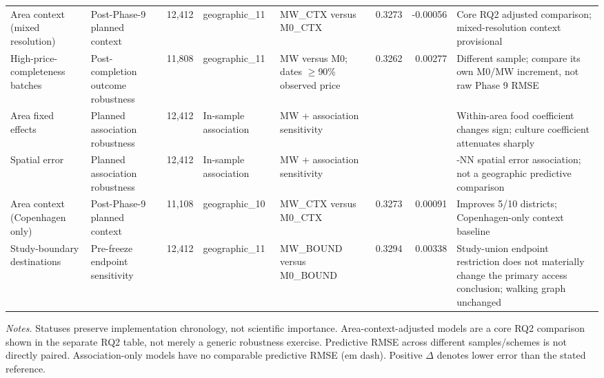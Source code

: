 \begin{landscape}
\begin{longtable}{>{\raggedright\arraybackslash}p{3.0cm}>{\raggedright\arraybackslash}p{2.9cm}r>{\raggedright\arraybackslash}p{2.7cm}>{\raggedright\arraybackslash}p{3.1cm}rr>{\raggedright\arraybackslash}p{6.7cm}}
Area context (mixed resolution) & Post-Phase-9 planned context & 12,412 & geographic\_\allowbreak{}11 & MW\_\allowbreak{}CTX versus M0\_\allowbreak{}CTX & 0.3273 & -0.00056 & Core RQ2 adjusted comparison; mixed-resolution context provisional \\
High-price-completeness batches & Post-completion outcome robustness & 11,808 & geographic\_\allowbreak{}11 & MW versus M0; dates $\geq$90\% observed price & 0.3262 & 0.00277 & Different sample; compare its own M0/MW increment, not raw Phase 9 RMSE \\
Area fixed effects & Planned association robustness & 12,412 & In-sample association & MW + association sensitivity & \textemdash{} & \textemdash{} & Within-area food coefficient changes sign; culture coefficient attenuates sharply \\
Spatial error & Planned association robustness & 12,412 & In-sample association & MW + association sensitivity & \textemdash{} & \textemdash{} & 8-NN spatial error association; not a geographic predictive comparison \\
Area context (Copenhagen only) & Post-Phase-9 planned context & 11,108 & geographic\_\allowbreak{}10 & MW\_\allowbreak{}CTX versus M0\_\allowbreak{}CTX & 0.3273 & 0.00091 & Improves 5/10 districts; Copenhagen-only context baseline \\
Study-boundary destinations & Pre-freeze endpoint sensitivity & 12,412 & geographic\_\allowbreak{}11 & MW\_\allowbreak{}BOUND versus M0\_\allowbreak{}BOUND & 0.3294 & 0.00338 & Study-union endpoint restriction does not materially change the primary access conclusion; walking graph unchanged \\
\bottomrule
\end{longtable}
{\footnotesize\noindent\emph{Notes.} Statuses preserve implementation chronology, not scientific importance. Area-context-adjusted models are a core RQ2 comparison shown in the separate RQ2 table, not merely a generic robustness exercise. Predictive RMSE across different samples/schemes is not directly paired. Association-only models have no comparable predictive RMSE (em dash). Positive $\Delta$ denotes lower error than the stated reference.\par}
\end{landscape}
